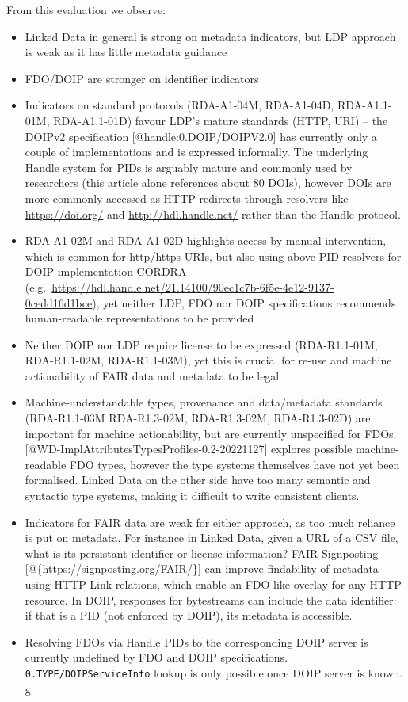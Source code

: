 From this evaluation we observe:

\begin{itemize}
\tightlist
\item
  Linked Data in general is strong on metadata indicators, but LDP
  approach is weak as it has little metadata guidance
\item
  FDO/DOIP are stronger on identifier indicators
\item
  Indicators on standard protocols (RDA-A1-04M, RDA-A1-04D,
  RDA-A1.1-01M, RDA-A1.1-01D) favour LDP's mature standards (HTTP, URI)
  -- the DOIPv2 specification {[}@handle:0.DOIP/DOIPV2.0{]} has
  currently only a couple of implementations and is expressed
  informally. The underlying Handle system for PIDs is arguably mature
  and commonly used by researchers (this article alone references about
  80 DOIs), however DOIs are more commonly accessed as HTTP redirects
  through resolvers like \url{https://doi.org/} and
  \url{http://hdl.handle.net/} rather than the Handle protocol.
\item
  RDA-A1-02M and RDA-A1-02D highlights access by manual intervention,
  which is common for http/https URIs, but also using above PID
  resolvers for DOIP implementation
  \href{https://www.cordra.org/}{CORDRA}
  (e.g.~\url{https://hdl.handle.net/21.14100/90ec1c7b-6f5e-4e12-9137-0cedd16d1bce}),
  yet neither LDP, FDO nor DOIP specifications recommends human-readable
  representations to be provided
\item
  Neither DOIP nor LDP require license to be expressed (RDA-R1.1-01M,
  RDA-R1.1-02M, RDA-R1.1-03M), yet this is crucial for re-use and
  machine actionability of FAIR data and metadata to be legal
\item
  Machine-understandable types, provenance and data/metadata standards
  (RDA-R1.1-03M RDA-R1.3-02M, RDA-R1.3-02M, RDA-R1.3-02D) are important
  for machine actionability, but are currently unspecified for FDOs.
  {[}@WD-ImplAttributesTypesProfiles-0.2-20221127{]} explores possible
  machine-readable FDO types, however the type systems themselves have
  not yet been formalised. Linked Data on the other side have too many
  semantic and syntactic type systems, making it difficult to write
  consistent clients.
\item
  Indicators for FAIR data are weak for either approach, as too much
  reliance is put on metadata. For instance in Linked Data, given a URL
  of a CSV file, what is its persistant identifier or license
  information? FAIR Signposting {[}@\{https://signposting.org/FAIR/\}{]}
  can improve findability of metadata using HTTP Link relations, which
  enable an FDO-like overlay for any HTTP resource. In DOIP, responses
  for bytestreams can include the data identifier: if that is a PID (not
  enforced by DOIP), its metadata is accessible.
\item
  Resolving FDOs via Handle PIDs to the corresponding DOIP server is
  currently undefined by FDO and DOIP specifications.
  \texttt{0.TYPE/DOIPServiceInfo} lookup is only possible once DOIP
  server is known. g
\end{itemize}

